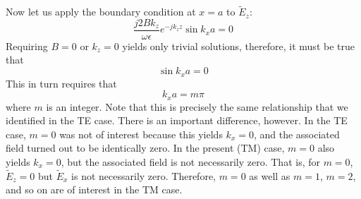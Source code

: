 %
Now let us apply the boundary condition at $x=a$ to $\widetilde{E}_{z}$:
%
\begin{equation}
\frac{j2B k_z}{\omega\epsilon} e^{-jk_z z} \sin k_x a  = 0
\end{equation} 
%
Requiring $B=0$ or $k_z=0$ yields only trivial solutions, therefore, it must be true that 
%
\begin{equation}
\sin{k_x a} = 0
\end{equation} 
%
This in turn requires that
%
\begin{equation}
k_x a = m \pi 
\end{equation}
%
where $m$ is an integer.
Note that this is precisely the same relationship that we identified in the TE case.
There is an important difference, however.
In the TE case, $m=0$ was not of interest because this yields $k_x=0$, and the associated field turned out to be identically zero.
In the present (TM) case, $m=0$ also yields $k_x=0$, but the associated field is not necessarily zero.
That is, for $m=0$, $\widetilde{E}_z=0$ but $\widetilde{E}_x$ is not necessarily zero.  
Therefore, $m=0$ as well as $m=1$, $m=2$, and so on are of interest in the TM case.

